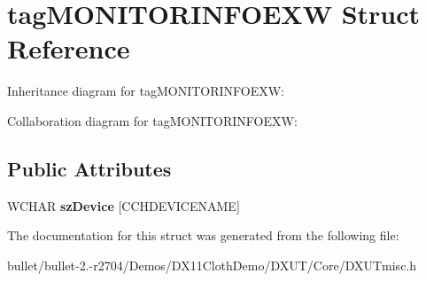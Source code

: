 \hypertarget{structtag_m_o_n_i_t_o_r_i_n_f_o_e_x_w}{\section{tag\+M\+O\+N\+I\+T\+O\+R\+I\+N\+F\+O\+E\+X\+W Struct Reference}
\label{structtag_m_o_n_i_t_o_r_i_n_f_o_e_x_w}
}


Inheritance diagram for tag\+M\+O\+N\+I\+T\+O\+R\+I\+N\+F\+O\+E\+X\+W\+:


Collaboration diagram for tag\+M\+O\+N\+I\+T\+O\+R\+I\+N\+F\+O\+E\+X\+W\+:
\subsection*{Public Attributes}
\begin{DoxyCompactItemize}
\item 
\hypertarget{structtag_m_o_n_i_t_o_r_i_n_f_o_e_x_w_a9d7d6cb2b406ae4f747f9a21cb34e6ab}{W\+C\+H\+A\+R {\bfseries sz\+Device} \mbox{[}C\+C\+H\+D\+E\+V\+I\+C\+E\+N\+A\+M\+E\mbox{]}}\label{structtag_m_o_n_i_t_o_r_i_n_f_o_e_x_w_a9d7d6cb2b406ae4f747f9a21cb34e6ab}

\end{DoxyCompactItemize}


The documentation for this struct was generated from the following file\+:\begin{DoxyCompactItemize}
\item 
bullet/bullet-\/2.-\/r2704/\+Demos/\+D\+X11\+Cloth\+Demo/\+D\+X\+U\+T/\+Core/D\+X\+U\+Tmisc.\+h\end{DoxyCompactItemize}
